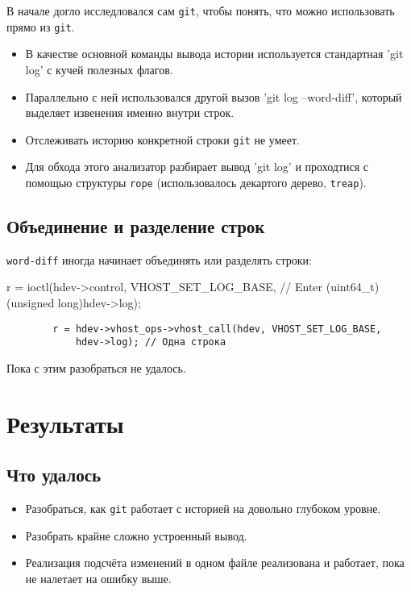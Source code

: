 \documentclass{beamer}
\makeatletter
\newcommand*{\currentname}{\@currentlabelname}
\def\t{\texttt}
\newcommand{\cimg}[2]{%
	\begin{center}%
		\ifthenelse{\equal{#2}{}}{%
			\texttt{[image: \#1]}
		}{%
			\texttt{[image: \#1]}
		}%
	\end{center}%
}
\makeatother
\begin{document}
\begin{frame}[t]{\currentname}
	В начале догло исследловался сам \t{git}, чтобы понять, что можно использовать прямо из \t{git}.
	\pause
	\begin{itemize}
	\item
		В качестве основной команды вывода истории используется стандартная \bash'git log' с кучей полезных флагов.
		\pause
	\item
		Параллельно с ней использовался другой вызов \bash'git log --word-diff', который выделяет извенения именно внутри строк.
		\pause
	\item
		Отслеживать историю конкретной строки \t{git} не умеет.
		\pause
	\item
		Для обхода этого анализатор разбирает вывод \bash'git log' и проходтися с помощью структуры \t{rope}
		(использовалось декартого дерево, \t{treap}).
	\end{itemize}
\end{frame}

\subsection{Объединение и разделение строк}

\begin{frame}[t,fragile]{\currentname}
	\t{word-diff} иногда начинает объединять или разделять строки:
	\pause
	\begin{ccode}
		r = ioctl(hdev->control, VHOST_SET_LOG_BASE, // Enter
		          (uint64_t)(unsigned long)hdev->log);
	\end{ccode}
	\pause
	\begin{verbatim}
		r = hdev->vhost_ops->vhost_call(hdev, VHOST_SET_LOG_BASE,
			hdev->log); // Одна строка
	\end{verbatim}
	\pause
	\visible<4->{
		\cimg{pain-2.png}{1}
	}
	\pause
	\visible<5->{
		\cimg{pain-1.png}{1}
	}
	\pause
	Пока с этим разобраться не удалось.
\end{frame}

\section{Результаты}
\subsection{Что удалось}

\begin{frame}[t]{\currentname}
	\pause
	\begin{itemize}
	\item
		Разобраться, как \t{git} работает с историей на довольно глубоком уровне.
		\pause
	\item
		Разобрать крайне сложно устроенный вывод.
		\pause
	\item
		Реализация подсчёта изменений в одном файле реализована и работает, пока не налетает на ошибку выше.
	\end{itemize}
\end{frame}
\end{document}
